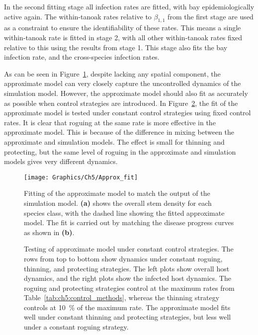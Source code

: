 In the second fitting stage all infection rates are fitted, with bay epidemiologically active again. The within-tanoak rates relative to $\beta_{1,1}$ from the first stage are used as a constraint to ensure the identifiability of these rates. This means a single within-tanoak rate is fitted in stage 2, with all other within-tanoak rates fixed relative to this using the results from stage 1. This stage also fits the bay infection rate, and the cross-species infection rates.

As can be seen in Figure~\ref{fig:ch5:approx_fit}, despite lacking any spatial component, the approximate model can very closely capture the uncontrolled dynamics of the simulation model. However, the approximate model should also fit as accurately as possible when control strategies are introduced. In Figure~\ref{fig:ch5:fit_under_control}, the fit of the approximate model is tested under constant control strategies using fixed control rates. It is clear that roguing at the same rate is more effective in the approximate model. This is because of the difference in mixing between the approximate and simulation models. The effect is small for thinning and protecting, but the same level of roguing in the approximate and simulation models gives very different dynamics.

\begin{figure}
    \begin{center}
        \texttt{[image: Graphics/Ch5/Approx\_fit]}
        \caption[Fitting of approximate model]{Fitting of the approximate model to match the output of the simulation model. \textbf{(a)} shows the overall stem density for each species class, with the dashed line showing the fitted approximate model. The fit is carried out by matching the disease progress curves as shown in \textbf{(b)}\label{fig:ch5:approx_fit}.}
    \end{center}
\end{figure}

\begin{figure}
    \begin{center}
        \caption[Testing of approximate model under control]{Testing of approximate model under constant control strategies. The rows from top to bottom show dynamics under constant roguing, thinning, and protecting strategies. The left plots show overall host dynamics, and the right plots show the infected host dynamics. The roguing and protecting strategies control at the maximum rates from Table~\ref{tab:ch5:control_methods}, whereas the thinning strategy controls at \SI{10}{\percent} of the maximum rate. The approximate model fits well under constant thinning and protecting strategies, but less well under a constant roguing strategy. \label{fig:ch5:fit_under_control}}
    \end{center}
\end{figure}

